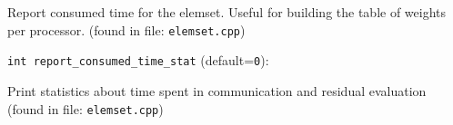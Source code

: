 Report consumed time for the elemset. Useful for building
the table of weights per processor. 
 (found in file: \verb+elemset.cpp+)
\item\verb+int report_consumed_time_stat+ {\rm(default=\verb|0|)}:

Print statistics about time spent in communication and residual evaluation
 (found in file: \verb+elemset.cpp+)
